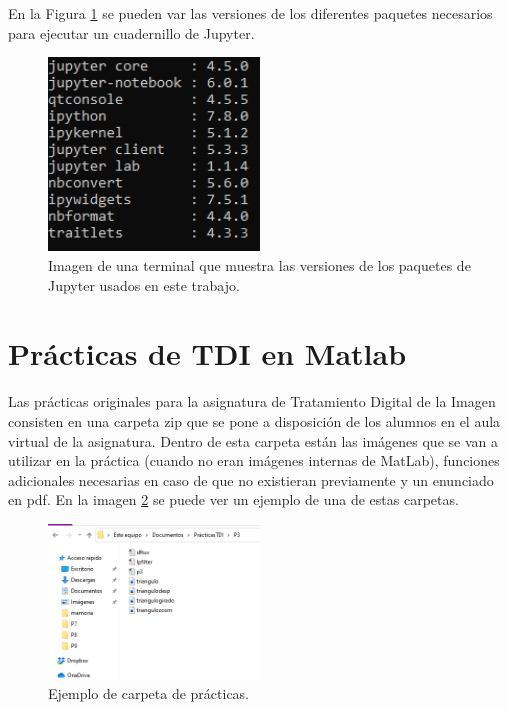En la Figura \ref{versionjupyter} se pueden var las versiones de los diferentes paquetes necesarios para ejecutar un cuadernillo de Jupyter.

\begin{figure}[h]
\centering
\includegraphics[width=0.5\textwidth]{imagenes/versionjupyter}
\caption{Imagen de una terminal que muestra las versiones de los paquetes de Jupyter usados en este trabajo.}
\label{versionjupyter}
\end{figure}


\section{Prácticas de TDI en Matlab}


Las prácticas originales para la asignatura de Tratamiento Digital de la Imagen consisten en una carpeta zip que se pone a disposición de los alumnos en el aula virtual de la asignatura. Dentro de esta carpeta están las imágenes que se van a utilizar en la práctica (cuando no eran imágenes internas de MatLab), funciones adicionales necesarias en caso de que no existieran previamente y un enunciado en pdf. En la imagen \ref{carpetapracticas} se puede ver un ejemplo de una de estas carpetas.
 
\begin{figure}[h]
\centering
\includegraphics[width=0.5\textwidth]{imagenes/carpetapracticas}
\caption{Ejemplo de carpeta de prácticas.}
\label{carpetapracticas}
\end{figure}

